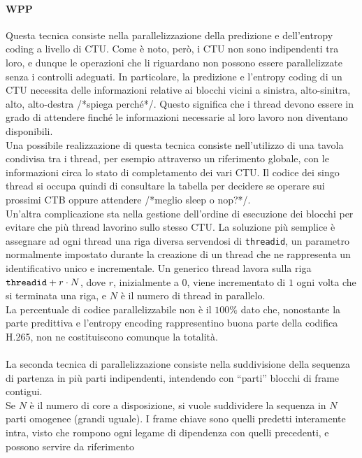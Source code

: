 \paragraph*{WPP} Questa tecnica consiste nella parallelizzazione della 
predizione e 
dell'entropy coding a livello di CTU. Come è noto, però, i CTU non sono 
indipendenti tra loro, e dunque le operazioni che li riguardano non possono 
essere parallelizzate senza i controlli adeguati. In particolare, la predizione 
e l'entropy coding di un CTU necessita delle informazioni relative ai blocchi 
vicini a sinistra, alto-sinitra, alto, alto-destra /*spiega perché*/. Questo 
significa che i thread devono essere in grado di attendere finché le 
informazioni necessarie al loro lavoro non diventano disponibili. \\
Una possibile realizzazione di questa tecnica consiste nell'utilizzo di una 
tavola condivisa tra i thread, per esempio attraverso un riferimento globale, 
con le informazioni circa lo stato di completamento dei vari CTU. Il codice dei 
singo thread si occupa quindi di consultare la tabella per decidere se operare 
sui prossimi CTB oppure attendere /*meglio sleep o nop?*/.\\
Un'altra complicazione sta nella gestione dell'ordine di esecuzione dei blocchi 
per evitare che più thread lavorino sullo stesso CTU. La soluzione più semplice 
è assegnare ad ogni thread una riga diversa servendosi di \verb|threadid|, un 
parametro normalmente impostato durante la creazione di un thread che ne 
rappresenta un identificativo unico e incrementale. Un generico thread lavora 
sulla riga $\verb|threadid| + r \cdot N$, dove $r$, inizialmente a $0$, viene 
incrementato di $1$ ogni volta che si terminata una riga, e $N$ è il numero di 
thread in parallelo.  \\
La percentuale di codice parallelizzabile non è il $100\%$ dato che, nonostante 
la parte predittiva e l'entropy encoding rappresentino buona parte della 
codifica H.265, non ne costituiscono comunque la totalità.
\\ \\
La seconda tecnica di parallelizzazione consiste nella 
suddivisione della sequenza di partenza in più parti indipendenti, intendendo 
con ``parti'' blocchi di frame contigui.\\
Se $N$ è il numero di core a disposizione, 
si vuole suddividere la sequenza in $N$ parti omogenee (grandi uguale). I frame 
chiave sono quelli predetti interamente intra, visto che rompono ogni 
legame di dipendenza con quelli precedenti, e possono servire da riferimento 
